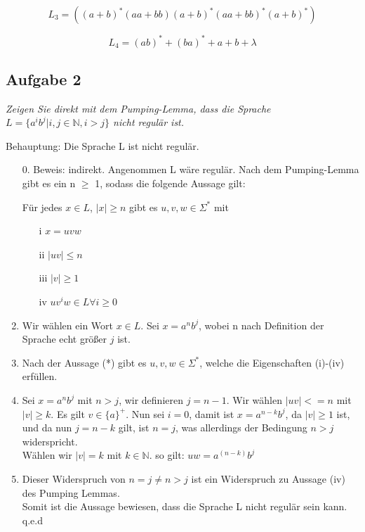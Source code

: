 \documentclass[a4paper]{article}
\begin{document}
$$L_3 = ((a+b)^*(aa+bb)(a+b)^*(aa+bb)^*(a+b)^*)$$

$$L_4 = (ab)^* + (ba)^*+a+b+\lambda$$


\subsection{Aufgabe 2}
\textit{Zeigen Sie direkt mit dem Pumping-Lemma, dass die Sprache $L=\{a^i b^j \vert i, j\in\mathbb{N}, i > j\}$ nicht regulär ist.}

Behauptung: Die Sprache L ist nicht regulär.
\begin{enumerate}
    \item[0.] Beweis: indirekt. Angenommen L wäre regulär. Nach dem Pumping-Lemma gibt es ein n $\geq$ 1, sodass die folgende Aussage gilt:
          \begin{center}
              Für jedes $x \in L$,  $\mid x \mid \geq n$ gibt es $u,v,w \in\Sigma^*$ mit
              \begin{itemize}
                  \item[i] $x = uvw$
                  \item[ii] $\mid uv \mid\leq n$
                  \item[iii] $\mid v \mid\geq 1$
                  \item[iv] $uv^iw \in L \forall i \geq 0$
              \end{itemize}
          \end{center}
    \item Wir wählen ein Wort $x\in L$. Sei $x = a^nb^j$, wobei n nach Definition der Sprache echt größer $j$ ist.
    \item Nach der Aussage (*) gibt es $u,v,w \in\Sigma^*$, welche die Eigenschaften (i)-(iv) erfüllen.
    \item Sei $x=a^nb^j$ mit $n > j$, wir definieren $j=n-1$.
          Wir wählen $\mid uv \mid < = n$ mit $\mid v\mid\geq k$. Es gilt $v\in\{a\}^+$. Nun sei $i = 0$, damit ist $x=a^{n-k}b^j$, da $\mid v\mid\geq 1$ ist, und da nun $j=n-k$ gilt, ist $n=j$, was allerdings der Bedingung $n>j$ widerspricht. \\
          Wählen wir $\mid v\mid = k$ mit $k\in\mathbb{N}$. so gilt: $uw =a^{(n-k)}b^j$
    \item Dieser Widerspruch von $n = j \neq n > j$ ist ein Widerspruch zu Aussage (iv) des Pumping Lemmas.\\
          Somit ist die Aussage bewiesen, dass die Sprache L nicht regulär sein kann. q.e.d
\end{enumerate}
\end{document}
